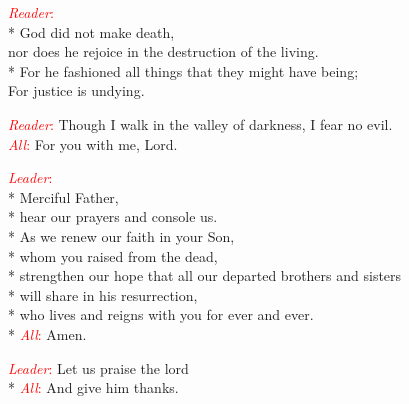\documentclass[letterpaper,13pt]{extarticle}
\newcommand{\sidestar}[1]{\textcolor{red}{\textit{#1}:}}
\begin{document}
\sidestar{Reader}\\*
God did not make death,\\
   nor does he rejoice in the destruction of the living.\\*
For he fashioned all things that they might have being;\\
   For justice is undying.

{}
\sidestar{Reader} Though I walk in the valley of darkness, I fear no evil.\\
\sidestar{All} For you with me, Lord.

\sidestar{Leader}\\*
Merciful Father, \\*
hear our prayers and console us.\\*
As we renew our faith in your Son,\\*
whom you raised from the dead,\\*
strengthen our hope that all our departed brothers and sisters\\*
will share in his resurrection,\\*
who lives and reigns with you for ever and ever.\\*
\sidestar{All} Amen.


\sidestar{Leader} Let us praise the lord \\*
\sidestar{All} And give him thanks.
\end{document}
